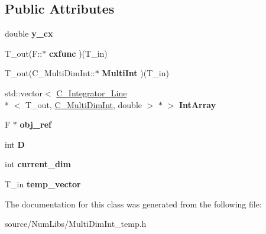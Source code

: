 \subsection*{Public Attributes}
\begin{DoxyCompactItemize}
\item 
\hypertarget{class_c___multi_dim_int_a9fe4bbfc25de6c309f5a6bd45d604631}{double {\bfseries y\-\_\-cx}}\label{class_c___multi_dim_int_a9fe4bbfc25de6c309f5a6bd45d604631}

\item 
\hypertarget{class_c___multi_dim_int_ad15e9fedfc5bc734ae1cb2e60a64732e}{T\-\_\-out(F\-::$\ast$ {\bfseries cxfunc} )(T\-\_\-in)}\label{class_c___multi_dim_int_ad15e9fedfc5bc734ae1cb2e60a64732e}

\item 
\hypertarget{class_c___multi_dim_int_aade9ed8244409042f4fab6f1d790e872}{T\-\_\-out(C\-\_\-\-Multi\-Dim\-Int\-::$\ast$ {\bfseries Multi\-Int} )(T\-\_\-in)}\label{class_c___multi_dim_int_aade9ed8244409042f4fab6f1d790e872}

\item 
\hypertarget{class_c___multi_dim_int_a8adc5343ffa6fce8a447a86ce6553612}{std\-::vector$<$ \hyperlink{class_c___integrator___line}{C\-\_\-\-Integrator\-\_\-\-Line}\\*
$<$ T\-\_\-out, \hyperlink{class_c___multi_dim_int}{C\-\_\-\-Multi\-Dim\-Int}, double $>$ $\ast$ $>$ {\bfseries Int\-Array}}\label{class_c___multi_dim_int_a8adc5343ffa6fce8a447a86ce6553612}

\item 
\hypertarget{class_c___multi_dim_int_a060b795caabf44d3470b2a0a7451f61e}{F $\ast$ {\bfseries obj\-\_\-ref}}\label{class_c___multi_dim_int_a060b795caabf44d3470b2a0a7451f61e}

\item 
\hypertarget{class_c___multi_dim_int_a90e4f342e5a43930668c614d1d944b35}{int {\bfseries D}}\label{class_c___multi_dim_int_a90e4f342e5a43930668c614d1d944b35}

\item 
\hypertarget{class_c___multi_dim_int_ac7eddd1045fed3620784cde94631a86e}{int {\bfseries current\-\_\-dim}}\label{class_c___multi_dim_int_ac7eddd1045fed3620784cde94631a86e}

\item 
\hypertarget{class_c___multi_dim_int_a00ea70efae03abdca8211477aa4c758c}{T\-\_\-in {\bfseries temp\-\_\-vector}}\label{class_c___multi_dim_int_a00ea70efae03abdca8211477aa4c758c}

\end{DoxyCompactItemize}


The documentation for this class was generated from the following file\-:\begin{DoxyCompactItemize}
\item 
source/\-Num\-Libs/Multi\-Dim\-Int\-\_\-temp.\-h\end{DoxyCompactItemize}
